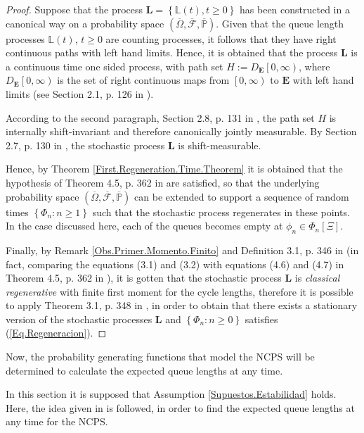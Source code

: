 \documentclass{article}
\newcommand{\prob}{\mathbb{P}}
\begin{document}
\begin{proof}
Suppose that the process $\mathbf{L}=\left\{\mathbb{L}\left(t\right),t\geq0\right\}$ has been constructed in a canonical way on a probability space $\left(\overline{\Omega},\overline{\mathcal{F}},\overline{\prob}\right)$.
Given that the queue length processes $\mathbb{L}\left(t\right)$, $t\geq0$ are counting processes, it follows that they have right continuous paths with left hand limits. Hence, it is obtained that the process $\mathbf{L}$ is a continuous time one sided process, with path set $H:=D_{\mathbf{E}}\left[0,\infty\right)$, where  $D_{\mathbf{E}}\left[0,\infty\right)$ is the set of right continuous  maps from $\left[0,\infty\right)$ to $\mathbf{E}$ with left hand limits (see Section 2.1,  p. 126 in \cite{Thorisson}).

According to the second paragraph, Section 2.8, p. 131 in \cite{Thorisson}, the path set $H$ is internally shift-invariant and therefore canonically jointly measurable. By Section 2.7, p. 130 in \cite{Thorisson}, the stochastic process $\mathbf{L}$ is shift-measurable. 

Hence, by Theorem \ref{First.Regeneration.Time.Theorem} it is obtained that the hypothesis of Theorem 4.5, p. 362 in \cite{Thorisson} are satisfied, so that the underlying probability space $\left(\overline{\Omega},\overline{\mathcal{F}},\overline{\prob}\right)$ can be extended to support a sequence of random times $\left\{\Phi_{n}:n\geq1\right\}$ such that the stochastic process regenerates in these points. In the case discussed here, each of the queues becomes empty at $\phi_{n}\in\Phi_{n}\left[\Xi\right]$.

Finally, by Remark \ref{Obs.Primer.Momento.Finito} and Definition 3.1, p. 346 in \cite{Thorisson} (in fact, comparing the equations (3.1) and (3.2) with equations (4.6) and (4.7) in Theorem 4.5, p. 362 in \cite{Thorisson}), it is gotten that the stochastic process $\mathbf{L}$ is {\it{classical regenerative}} with finite first moment for the cycle lengths, therefore it is possible to apply Theorem 3.1, p. 348 in \cite{Thorisson}, in order to obtain that there exists a stationary version of the stochastic processes $\mathbf{L}$ and $\left\{\Phi_{n}:n\geq0\right\}$ satisfies (\ref{Eq.Regeneracion}).
\end{proof}%
\medskip
Now, the probability generating functions that model the NCPS will be determined to calculate the expected queue lengths at any time.

In this section it is supposed that Assumption \ref{Supuestos.Estabilidad} holds. Here, the idea given in \cite{Takagi} is followed, in order to find the expected queue lengths at any time for the NCPS. 
\end{document}
